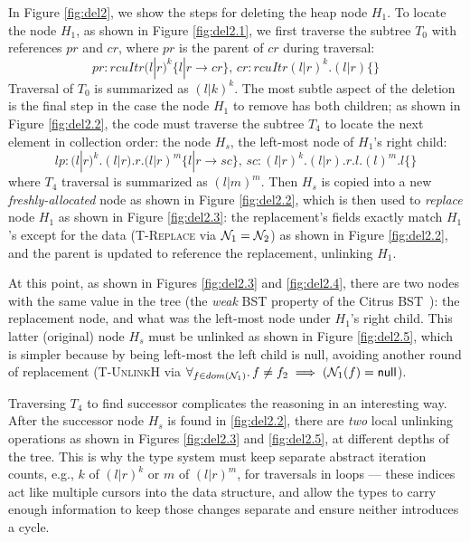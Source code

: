In Figure \ref{fig:del2}, we show the steps for deleting the heap node $H_1$. To locate the node $H_1$, as shown in Figure \ref{fig:del2.1}, we first traverse the subtree $T_0$ with references $pr$ and $cr$, where $pr$ is the parent of $cr$ during traversal:
\[ pr:rcuItr(l|r)^{k} \{l|r \rightarrow cr\},\, cr:rcuItr(l|r)^{k}.(l|r) \{\}\]
Traversal of $T_0$ is summarized as $(l|k)^{k}$. The most subtle aspect of the deletion is the final step in the case the node $H_1$ to remove has both children; as shown in Figure \ref{fig:del2.2}, the code must traverse the subtree $T_4$ to locate the next element in collection order: the node $H_s$, the left-most node of $H_1$'s right child:
\[lp:(l|r)^{k}.(l|r).r.(l|r)^{m} \{l|r \rightarrow sc\},\, sc:(l|r)^{k}.(l|r).r.l.(l)^{m}.l\{\}\]
where $T_4$ traversal is summarized as $(l|m)^{m}$. Then $H_s$ is copied into a new \textit{freshly-allocated} node as shown in Figure \ref{fig:del2.2}, which is then used to \emph{replace} node $H_1$ as shown in Figure \ref{fig:del2.3}: the replacement's fields exactly match $H_1$'s except for the data (\textsc{T-Replace} via $\mathcal{N}_1 = \mathcal{N}_2$) as shown in Figure \ref{fig:del2.2}, and the parent is updated to reference the replacement, unlinking $H_1$.

At this point, as shown in Figures \ref{fig:del2.3} and \ref{fig:del2.4}, there are two nodes with the same value in the tree (the \textit{weak} BST property of the Citrus BST~\cite{Arbel:2014:CUR:2611462.2611471}): the replacement node, and what was the left-most node under $H_1$'s right child. This latter (original) node $H_s$ must be unlinked as shown in Figure \ref{fig:del2.5}, which is simpler because by being left-most the left child is null, avoiding another round of replacement (\textsc{T-UnlinkH} via $\forall_{f\in dom(\mathcal{N}_1)} \ldotp f\neq f_2 \implies (\mathcal{N}_1(f) = \textsf{null}$).

Traversing $T_4$ to find successor complicates the reasoning in an interesting way. After the successor node $H_s$ is found in \ref{fig:del2.2}, there are \emph{two} local unlinking operations as shown in Figures \ref{fig:del2.3} and \ref{fig:del2.5}, at different depths of the tree.  This is why the type system must keep separate abstract iteration counts, e.g., $k$ of $(l|r)^{k}$ or $m$ of $(l|r)^{m}$, for traversals in loops --- these indices act like multiple cursors into the data structure, and allow the types to carry enough information to keep those changes separate and ensure neither introduces a cycle.

